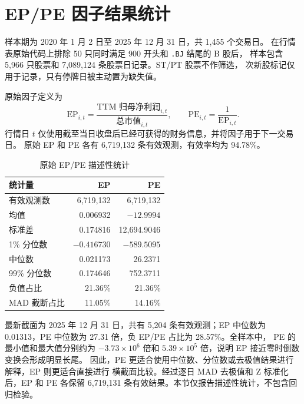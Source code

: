 \section{EP/PE 因子结果统计}

样本期为 2020 年 1 月 2 日至 2025 年 12 月 31 日，共 1,455 个交易日。
在行情表原始代码上排除 50 只同时满足 900 开头和 \texttt{.BJ} 结尾的 B 股后，
样本包含 5,966 只股票和 7,089,124 条股票日记录。ST/PT 股票不作筛选，
次新股标记仅用于记录，只有停牌日被主动置为缺失值。

原始因子定义为
\begin{equation}
  \mathrm{EP}_{i,t}
  =\frac{\text{TTM 归母净利润}_{i,t}}{\text{总市值}_{i,t}},
  \qquad
  \mathrm{PE}_{i,t}=\frac{1}{\mathrm{EP}_{i,t}}.
\end{equation}
行情日 $t$ 仅使用截至当日收盘后已经可获得的财务信息，并将因子用于下一交易日。
原始 EP 和 PE 各有 6,719,132 条有效观测，有效率均为 94.78\%。

\begin{table}[htbp]
  \centering
  \caption{原始 EP/PE 描述性统计}
  \label{tab:ep-pe-descriptive}
  \begin{tabular}{lrr}
    \toprule
    统计量 & EP & PE \\
    \midrule
    有效观测数 & 6,719,132 & 6,719,132 \\
    均值 & 0.006932 & $-12.9994$ \\
    标准差 & 0.174816 & 12,694.9046 \\
    1\% 分位数 & $-0.416730$ & $-589.5095$ \\
    中位数 & 0.021173 & 26.2371 \\
    99\% 分位数 & 0.174646 & 752.3711 \\
    负值占比 & 21.36\% & 21.36\% \\
    MAD 截断占比 & 11.05\% & 14.16\% \\
    \bottomrule
  \end{tabular}
\end{table}

最新截面为 2025 年 12 月 31 日，共有 5,204 条有效观测；EP 中位数为
0.01313，PE 中位数为 27.31 倍，负 EP/PE 占比为 28.57\%。全样本中，
PE 的最小值和最大值分别约为 $-3.73\times10^{6}$ 倍和
$5.39\times10^{5}$ 倍，说明 EP 接近零时倒数变换会形成明显长尾。
因此，PE 更适合使用中位数、分位数或去极值结果进行解释，EP 则更适合直接进行
横截面比较。经过逐日 MAD 去极值和 Z 标准化后，EP 和 PE 各保留
6,719,131 条有效结果。本节仅报告描述性统计，不包含回归检验。
